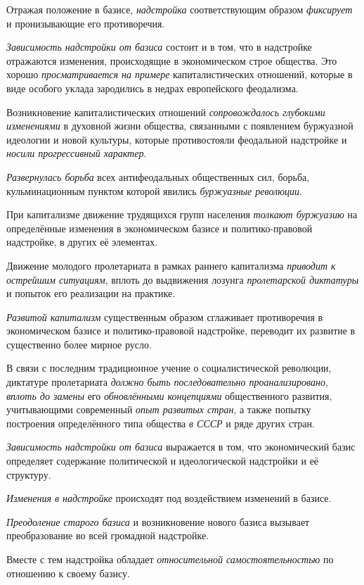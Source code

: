 \documentclass[a4paper,14pt,russian]{extreport}
\begin{document}
Отражая положение в базисе, \emph{надстройка} соответствующим образом \emph{фиксирует} и пронизывающие его противоречия.

\emph{Зависимость надстройки от базиса} состоит и в том, что в надстройке отражаются изменения, происходящие в экономическом строе общества. Это хорошо \emph{просматривается на примере} капиталистических отношений, которые в виде особого уклада зародились в недрах европейского феодализма.

Возникновение капиталистических отношений \emph{сопровождалось глубокими изменениями} в духовной жизни общества, связанными с появлением буржуазной идеологии и новой культуры, которые противостояли феодальной надстройке и \emph{носили прогрессивный характер}.

\emph{Развернулась борьба} всех антифеодальных общественных сил, борьба, кульминационным пунктом которой явились \emph{буржуазные революции}.

При капитализме движение трудящихся групп населения \emph{толкают буржуазию} на определённые изменения в экономическом базисе и политико-правовой надстройке, в других её элементах.

Движение молодого пролетариата в рамках раннего капитализма \emph{приводит к острейшим ситуациям}, вплоть до выдвижения лозунга \emph{пролетарской диктатуры} и попыток его реализации на практике.

\emph{Развитой капитализм} существенным образом сглаживает противоречия в экономическом базисе и политико-правовой надстройке, переводит их развитие в существенно более мирное русло.

В связи с последним традиционное учение о социалистической революции, диктатуре пролетариата \emph{должно быть последовательно проанализировано}, \emph{вплоть до замены} его \emph{обновлёнными концепциями} общественного развития, учитывающими современный \emph{опыт развитых стран}, а также попытку построения определённого типа общества \emph{в СССР} и ряде других стран.

\emph{Зависимость надстройки от базиса} выражается в том, что экономический базис определяет содержание политической и идеологической надстройки и её структуру.

\emph{Изменения в надстройке} происходят под воздействием изменений в базисе.

\emph{Преодоление старого базиса} и возникновение нового базиса вызывает преобразование во всей громадной надстройке.

Вместе с тем надстройка обладает \emph{относительной самостоятельностью} по отношению к своему базису.
\end{document}
